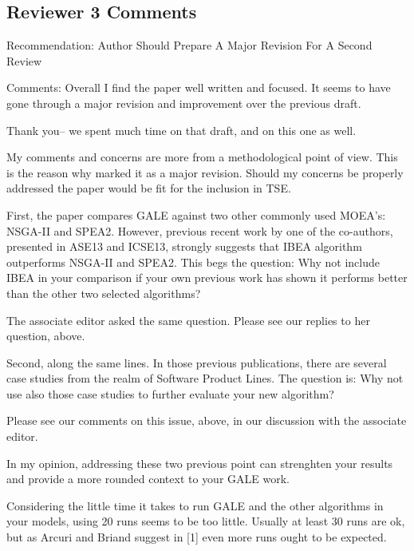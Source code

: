 \documentclass[10pt,journal,compsoc]{IEEEtran}
\newenvironment{changed}{\par}{\par}
\begin{document}
\subsection{Reviewer 3 Comments}

Recommendation: Author Should Prepare A Major Revision For A Second Review

Comments:
Overall I find the paper well written and focused. It seems to have gone through a major revision and improvement over the previous draft.
\begin{changed}
Thank you-- we spent much time on that draft, and on this one as well.
\end{changed}

My comments and concerns are more from a methodological point of view. This is the reason why marked it as a major revision. Should my concerns be properly addressed the paper would be fit for the inclusion in TSE.

First, the paper compares GALE against two other commonly used MOEA's: NSGA-II and SPEA2. However, previous recent work by one of the co-authors, presented in ASE13 and ICSE13, strongly suggests that IBEA algorithm outperforms NSGA-II and SPEA2. This begs the question: Why not include IBEA in your comparison if your own previous work has shown it performs better than the other two selected algorithms?

\begin{changed}
The associate editor asked the same question. Please see our replies
to her question, above.
\end{changed}

Second, along the same lines. In those previous
publications, there are several case studies from
the realm of Software Product Lines. The question
is: Why not use also those case studies to further
evaluate your new algorithm?


\begin{changed}
Please see our comments on this issue, above, in our discussion with the
associate editor.
\end{changed}
In my opinion, addressing these two previous point can strenghten your results and provide a more rounded context to your GALE work.

Considering the little time it takes to run GALE and the other algorithms in your models, using 20 runs seems to be too little. Usually at least 30 runs are ok, but as Arcuri and Briand suggest in [1] even more runs ought to be expected.
\end{document}

